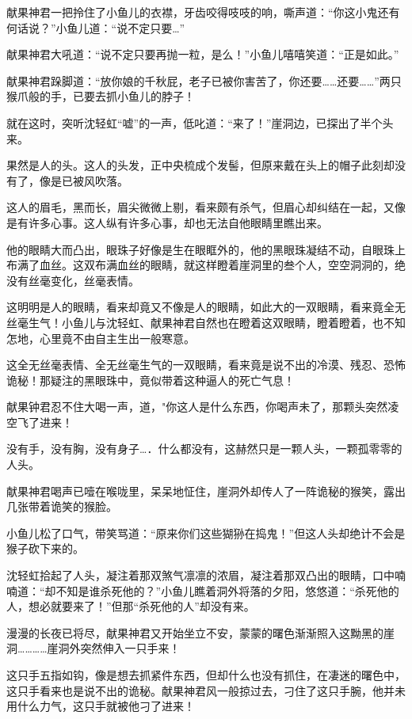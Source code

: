 \documentclass[12pt,oneside]{book}
\begin{document}
献果神君一把拎住了小鱼儿的衣襟，牙齿咬得吱吱的响，嘶声道：``你这小鬼还有何话说？''小鱼儿道：``说不定只要\ldots{}''

献果神君大吼道：``说不定只要再抛一粒，是么！''小鱼儿嘻嘻笑道：``正是如此。''

献果神君跺脚道：``放你娘的千秋屁，老子已被你害苦了，你还要\ldots\ldots 还要\ldots\ldots{}''两只猴爪般的手，已要去抓小鱼儿的脖子！

就在这时，突听沈轻虹``嘘''的一声，低叱道：``来了！''崖洞边，已探出了半个头来。

果然是人的头。这人的头发，正中央梳成个发髻，但原来戴在头上的帽子此刻却没有了，像是已被风吹落。

这人的眉毛，黑而长，眉尖微微上剔，看来颇有杀气，但眉心却纠结在一起，又像是有许多心事。这人纵有许多心事，却也无法自他眼睛里瞧出来。

他的眼睛大而凸出，眼珠子好像是生在眼眶外的，他的黑眼珠凝结不动，自眼珠上布满了血丝。这双布满血丝的眼睛，就这样瞪着崖洞里的叁个人，空空洞洞的，绝没有丝毫变化，丝毫表情。

这明明是人的眼睛，看来却竟又不像是人的眼睛，如此大的一双眼睛，看来竟全无丝毫生气！小鱼儿与沈轻虹、献果神君自然也在瞪着这双眼睛，瞪着瞪着，也不知怎地，心里竟不由自主生出一般寒意。

这全无丝毫表情、全无丝毫生气的一双眼睛，看来竟是说不出的冷漠、残忍、恐怖诡秘！那疑注的黑眼珠中，竟似带着这种逼人的死亡气息！

献果钟君忍不住大喝一声，道，"你这人是什么东西，你喝声未了，那颗头突然凌空飞了进来！

没有手，没有胸，没有身子\ldots．什么都没有，这赫然只是一颗人头，一颗孤零零的人头。

献果神君喝声已噎在喉咙里，呆呆地怔住，崖洞外却传人了一阵诡秘的猴笑，露出几张带着诡笑的猴脸。

小鱼儿松了口气，带笑骂道：``原来你们这些猢狲在捣鬼！''但这人头却绝计不会是猴子砍下来的。

沈轻虹拾起了人头，凝注着那双煞气凛凛的浓眉，凝注着那双凸出的眼睛，口中喃喃道：``却不知是谁杀死他的？''小鱼儿瞧着洞外将落的夕阳，悠悠道：``杀死他的人，想必就要来了！''但那``杀死他的人''却没有来。

漫漫的长夜已将尽，献果神君又开始坐立不安，蒙蒙的曙色渐渐照入这黝黑的崖洞\ldots\ldots\ldots\ldots 崖洞外突然伸入一只手来！

这只手五指如钩，像是想去抓紧件东西，但却什么也没有抓住，在凄迷的曙色中，这只手看来也是说不出的诡秘。献果神君风一般掠过去，刁住了这只手腕，他并未用什么力气，这只手就被他刁了进来！
\end{document}

